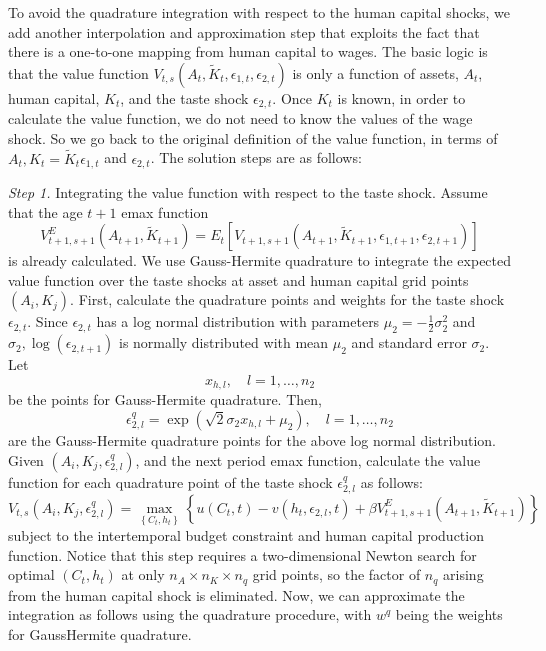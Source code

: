 \documentclass{article}
\begin{document}
To avoid the quadrature integration with respect to the human capital shocks, we add another interpolation and approximation step that exploits the fact that there is a one-to-one mapping from human capital to wages. The basic logic is that the value function $V_{t, s}\left(A_t, \tilde{K}_t, \epsilon_{1, t}, \epsilon_{2, t}\right)$ is only a function of assets, $A_t$, human capital, $K_t$, and the taste shock $\epsilon_{2, t}$. Once $K_t$ is known, in order to calculate the value function, we do not need to know the values of the wage shock. So we go back to the original definition of the value function, in terms of $A_t, K_t=\tilde{K}_t \epsilon_{1, t}$ and $\epsilon_{2, t}$. The solution steps are as follows: \par
\medskip
\textit{Step 1.}     Integrating the value function with respect to the taste shock. Assume that the age $t+1$ emax function
$$
V_{t+1, s+1}^E\left(A_{t+1}, \tilde{K}_{t+1}\right)=E_t\left[V_{t+1, s+1}\left(A_{t+1}, \tilde{K}_{t+1}, \epsilon_{1, t+1}, \epsilon_{2, t+1}\right)\right]
$$
is already calculated. We use Gauss-Hermite quadrature to integrate the expected value function over the taste shocks at asset and human capital grid points $\left(A_i, K_j\right)$. First, calculate the quadrature points and weights for the taste shock $\epsilon_{2, t}$. Since $\epsilon_{2, t}$ has a log normal distribution with parameters $\mu_2=-\frac{1}{2} \sigma_2^2$ and $\sigma_2, \log \left(\epsilon_{2, t+1}\right)$ is normally distributed with mean $\mu_2$ and standard error $\sigma_2$. Let
$$
x_{h, l}, \quad l=1, \ldots, n_2
$$
be the points for Gauss-Hermite quadrature. Then,
$$
\epsilon_{2, l}^q=\exp \left(\sqrt{2} \sigma_2 x_{h, l}+\mu_2\right), \quad l=1, \ldots, n_2
$$
are the Gauss-Hermite quadrature points for the above log normal distribution. Given $\left(A_i, K_j, \epsilon_{2, l}^q\right)$, and the next period emax function, calculate the value function for each quadrature point of the taste shock $\epsilon_{2, l}^q$ as follows:
$$
V_{t, s}\left(A_i, K_j, \epsilon_{2, l}^q\right)=\max _{\left\{C_t, h_t\right\}}\left\{u\left(C_t, t\right)-v\left(h_t, \epsilon_{2, l}, t\right)+\beta V_{t+1, s+1}^E\left(A_{t+1}, \tilde{K}_{t+1}\right)\right\}
$$
subject to the intertemporal budget constraint and human capital production function. Notice that this step requires a two-dimensional Newton search for optimal $\left(C_t, h_t\right)$ at only $n_A \times n_K \times n_q$ grid points, so the factor of $n_q$ arising from the human capital shock is eliminated. Now, we can approximate the integration as follows using the quadrature procedure, with $w^q$ being the weights for GaussHermite quadrature.
\end{document}
